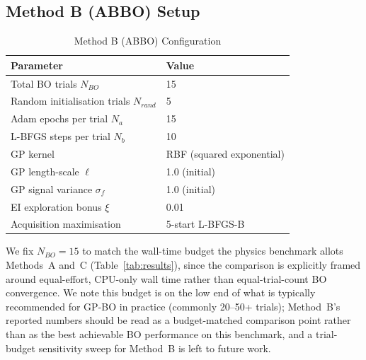 \documentclass[11pt]{article}
\theoremstyle{definition}
\begin{document}
\subsection{Method B (ABBO) Setup}
\begin{table}[H]
\centering
\caption{Method B (ABBO) Configuration}
\label{tab:setup_b}
\renewcommand{\arraystretch}{1.2}
\begin{tabular}{ll}
\toprule
Parameter & Value \\
\midrule
Total BO trials $N_{BO}$              & 15 \\
Random initialisation trials $N_{rand}$ & 5 \\
Adam epochs per trial $N_a$           & 15 \\
L-BFGS steps per trial $N_b$          & 10 \\
GP kernel                             & RBF (squared exponential) \\
GP length-scale $\ell$                & 1.0 (initial) \\
GP signal variance $\sigma_f$         & 1.0 (initial) \\
EI exploration bonus $\xi$            & 0.01 \\
Acquisition maximisation              & 5-start L-BFGS-B \\
\bottomrule
\end{tabular}
\end{table}

We fix $N_{BO}=15$ to match the wall-time budget the physics
benchmark allots Methods~A and~C (Table~\ref{tab:results}), since the
comparison is explicitly framed around equal-effort, CPU-only wall
time rather than equal-trial-count BO convergence. We note this
budget is on the low end of what is typically recommended for GP-BO
in practice (commonly 20--50+ trials); Method~B's reported numbers
should be read as a budget-matched comparison point rather than as
the best achievable BO performance on this benchmark, and a
trial-budget sensitivity sweep for Method~B is left to future work.
\end{document}

